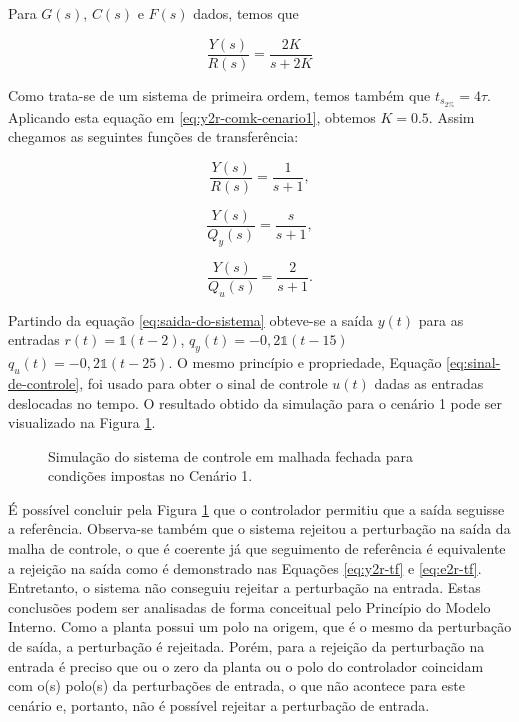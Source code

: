 Para $G(s)$, $C(s)$ e $F(s)$ dados, temos que

\begin{equation}
    \label{eq:y2r-comk-cenario1}
    \frac{Y(s)}{R(s)} = \frac{2K}{s + 2K}
\end{equation}

Como trata-se de um sistema de primeira ordem, temos também que $t_{s_{2\%}} =
4\tau$. Aplicando esta equação em \ref{eq:y2r-comk-cenario1}, obtemos $K = 0.5$.
Assim chegamos as seguintes funções de transferência:

\begin{equation}
    \label{eq:y2r-cenario1}
    \frac{Y(s)}{R(s)} = \frac{1}{s + 1},
\end{equation}

\begin{equation}
    \label{eq:y2qy-cenario1}
    \frac{Y(s)}{Q_{y}(s)} = \frac{s}{s + 1},
\end{equation}

\begin{equation}
    \label{eq:y2qu-cenario1}
    \frac{Y(s)}{Q_{u}(s)} = \frac{2}{s + 1}.
\end{equation}

Partindo da equação \ref{eq:saida-do-sistema} obteve-se a saída $y(t)$ para as
entradas $r(t) = \mathds{1}(t - 2)$, $q_{y}(t) = -0,2\mathds{1}(t - 15)$
$q_{u}(t) = -0,2\mathds{1}(t - 25)$. O mesmo princípio e propriedade, Equação
\ref{eq:sinal-de-controle}, foi usado para obter o sinal de controle $u(t)$
dadas as entradas deslocadas no tempo. O resultado obtido da simulação para o
cenário 1 pode ser visualizado na Figura \ref{fig:resultado-cenario1}.

\begin{figure}[!ht]
    \caption{Simulação do sistema de controle em malhada fechada para condições
    impostas no Cenário 1.}
    \vspace{-10pt}
    \hspace{-30pt}
    \label{fig:resultado-cenario1}
    \begin{minipage}{\linewidth}
        
    \end{minipage}
\end{figure}

É possível concluir pela Figura \ref{fig:resultado-cenario1} que o
controlador permitiu que a saída seguisse a referência. Observa-se também que o
sistema rejeitou a perturbação na saída da malha de controle, o que é coerente
já que seguimento de referência é equivalente a rejeição na saída como é
demonstrado nas Equações \ref{eq:y2r-tf} e \ref{eq:e2r-tf}. Entretanto, o
sistema não conseguiu rejeitar a perturbação na entrada. Estas conclusões
podem ser analisadas de forma conceitual pelo Princípio do Modelo Interno. Como
a planta possui um polo na origem, que é o mesmo da perturbação de saída, a
perturbação é rejeitada. Porém, para a rejeição da perturbação na entrada é
preciso que ou o zero da planta ou o polo do controlador coincidam com o(s)
polo(s) da perturbações de entrada, o que não acontece para este cenário e,
portanto, não é possível rejeitar a perturbação de entrada.

